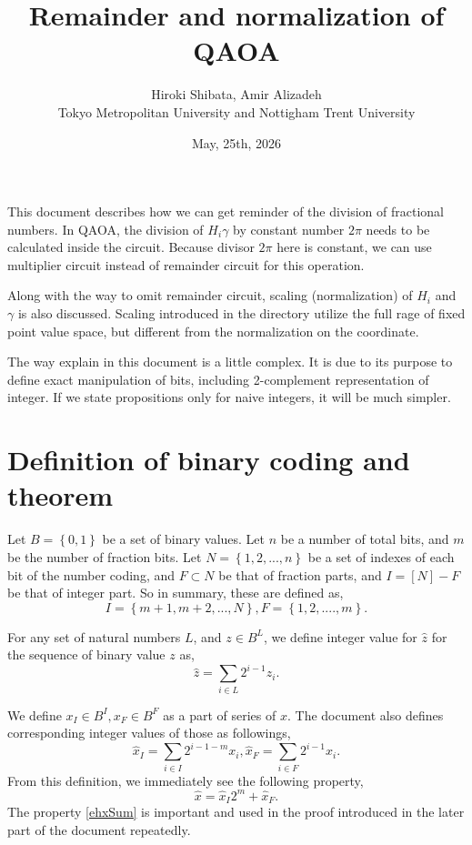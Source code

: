 \documentclass[a4paper]{article}
\title{Remainder and normalization of QAOA}
\date{May, 25th, 2026}
\author{Hiroki Shibata, Amir Alizadeh\\Tokyo Metropolitan University and Nottigham Trent University}
\newcommand{\eqlabel}[1]{\label{#1}\tag{#1}}
\newcommand{\cbr}[1]{\left\{#1\right\}}
\newcommand{\hx}{{\hat{x}}}
\newcommand{\hz}{{\hat{z}}}
\begin{document}
\maketitle
This document describes how we can get reminder of the division of fractional numbers. In QAOA, the division of \(H_i\gamma\) by constant number \(2 \pi\) needs to be calculated inside the circuit. Because divisor \(2\pi\) here is constant, we can use multiplier circuit instead of remainder circuit for this operation. 

Along with the way to omit remainder circuit, scaling (normalization) of \(H_i\) and \(\gamma\) is also discussed. Scaling introduced in the directory utilize the full rage of fixed point value space, but different from the normalization on the coordinate.

The way explain in this document is a little complex. It is due to its purpose to define exact manipulation of bits, including 2-complement representation of integer. If we state propositions only for naive integers, it will be much simpler. 

\section{Definition of binary coding and theorem}
Let \(B = \cbr{0, 1}\) be a set of binary values. Let \(n\) be a number of total bits, and \(m\) be the number of fraction bits. Let \(N = \cbr{1, 2, ..., n}\) be a set of indexes of each bit of the number coding, and \(F\subset N\) be that of fraction parts, and \(I  = [N] - F\)  be that of integer part. So in summary, these are defined as,
\begin{equation}
    \eqlabel{eIF}
    I = \cbr{m+1, m+2, ..., N}, F = \cbr{1, 2, ...., m}.
\end{equation}

For any set of natural numbers \(L\), and \(z\in B^L\), we define integer value for \(\hat{z}\) for the sequence of binary value \(z\) as,
\begin{equation}
    \eqlabel{eB2I}
    \hz = \sum_{i\in L} 2^{i-1} z_i.
\end{equation}

We define \(x_I\in B^I, x_F\in B^F\) as a part of series of \(x\). The document also defines corresponding integer values of those as followings,
\begin{equation}
    \eqlabel{eDefxIxF}
    \hx_I = \sum_{i\in I}2^{i-1-m} x_i, \hx_F = \sum_{i\in F}2^{i-1} x_i.
\end{equation}
From this definition, we immediately see the following property,
\begin{equation}
    \eqlabel{ehxSum}
    \hx = \hx_I 2^m + \hx_F.
\end{equation}
The property \eqref{ehxSum} is important and used in the proof introduced in the later part of the document repeatedly.
\end{document}
